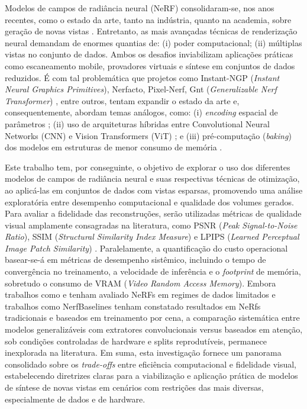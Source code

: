 \documentclass[12pt]{article}
\begin{document}
Modelos de campos de radiância neural (NeRF) consolidaram-se, nos anos recentes, como o estado da arte, tanto na indústria, quanto na academia, sobre geração de novas vistas \cite{kerbl3Dgaussians, Tancik2023, substance3dviewer}. Entretanto, as mais avançadas técnicas de renderização neural demandam de enormes quantias de: (i) poder computacional; (ii) múltiplas vistas no conjunto de dados. Ambos os desafios inviabilizam aplicações práticas como escaneamento mobile, provadores virtuais e síntese em conjuntos de dados reduzidos. É com tal problemática que projetos como Instant-NGP (\textit{Instant Neural Graphics Primitives}), Nerfacto, Pixel-Nerf, Gnt (\textit{Generalizable Nerf Transformer}) \cite{muller2022, Tancik2023, yu2021pixelnerfneuralradiancefields, t2023attentionnerfneeds}, entre outros, tentam expandir o estado da arte e, consequentemente, abordam temas análogos, como: (i) \textit{encoding} espacial de parâmetros \cite{muller2022}; (ii) uso de arquiteturas híbridas entre Convolutional Neural Networks (CNN) e Vision Transformers (ViT) \cite{schwarz2021grafgenerativeradiancefields, wu2021cvt, t2023attentionnerfneeds}; e (iii) pré-computação (\textit{baking}) dos modelos em estruturas de menor consumo de memória \cite{hedman2021bakingneuralradiancefields}.

Este trabalho tem, por conseguinte, o objetivo de explorar o uso dos diferentes modelos de campos de radiância neural e suas respectivas técnicas de otimização, ao aplicá-las em conjuntos de dados com vistas esparsas, promovendo uma análise exploratória entre desempenho computacional e qualidade dos volumes gerados. Para avaliar a fidelidade das reconstruções, serão utilizadas métricas de qualidade visual amplamente consagradas na literatura, como PSNR (\textit{Peak Signal-to-Noise Ratio}), SSIM (\textit{Structural Similarity Index Measure}) \cite{wang2004image} e LPIPS (\textit{Learned Perceptual Image Patch Similarity}) \cite{zhang2018unreasonable}. Paralelamente, a quantificação do custo operacional basear-se-á em métricas de desempenho sistêmico, incluindo o tempo de convergência no treinamento, a velocidade de inferência e o \textit{footprint} de memória, sobretudo o consumo de VRAM (\textit{Video Random Access Memory}). Embora trabalhos como \cite{niemeyer2022regnerf} e \cite{kim2023poserefinement} tenham avaliado NeRFs em regimes de dados limitados e trabalhos como NerfBaselines \cite{kulhanek2025nerfbaselinesconsistentreproducibleevaluation} tenham constatado resultados em NeRfs tradicionais e baseados em treinamento por cena, a comparação sistemática entre modelos generalizáveis com extratores convolucionais versus baseados em atenção, sob condições controladas de hardware e splits reprodutíveis, permanece inexplorada na literatura. Em suma, esta investigação fornece um panorama consolidado sobre os \textit{trade-offs} entre eficiência computacional e fidelidade visual, estabelecendo diretrizes claras para a viabilização e aplicação prática de modelos de síntese de novas vistas em cenários com restrições das mais diversas, especialmente de dados e de hardware.
\end{document}
